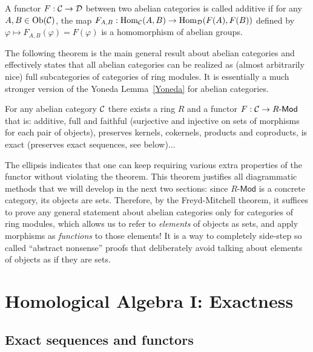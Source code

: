 \begin{defn}
    A functor $F:\mathcal{C}\to\mathcal{D}$ between two abelian categories is called additive if for any $A,B\in\operatorname{Ob}(\mathcal{C})$, the map $F_{A,B}:\operatorname{Hom}_{\mathcal{C}}(A,B)\to \operatorname{Hom}_{\mathcal{D}}(F(A),F(B))$ defined by $\varphi\mapsto F_{A,B}(\varphi)=F(\varphi)$ is a homomorphism of abelian groups.
\end{defn}

The following theorem is the main general result about abelian categories and effectively states that all abelian categories can be realized as (almost arbitrarily nice) full subcategories of categories of ring modules. It is essentially a much stronger version of the Yoneda Lemma~\ref{Yoneda} for abelian categories.

\begin{thm}\label{Theorem!Freyd-Mitchell}
    For any abelian category $\mathcal{C}$ there exists a ring $R$ and a functor $F:\mathcal{C}\to R\text{-}\mathsf{Mod}$ that is: additive, full and faithful (surjective and injective on sets of morphisms for each pair of objects), preserves kernels, cokernels, products and coproducts, is exact (preserves exact sequences, see below)...
\end{thm}
The ellipsis indicates that one can keep requiring various extra properties of the functor without violating the theorem. This theorem justifies all diagrammatic methods that we will develop in the next two sections: since $R\text{-}\mathsf{Mod}$ is a concrete category, its objects are sets. Therefore, by the Freyd-Mitchell theorem, it suffices to prove any general statement about abelian categories only for categories of ring modules, which allows us to refer to \emph{elements} of objects as sets, and apply morphisms as \emph{functions} to those elements! It is a way to completely side-step so called ``abstract nonsense'' proofs that deliberately avoid talking about elements of objects as if they are sets.






\clearpage
\chapter{Homological Algebra I: Exactness}

\section{Exact sequences and functors}

